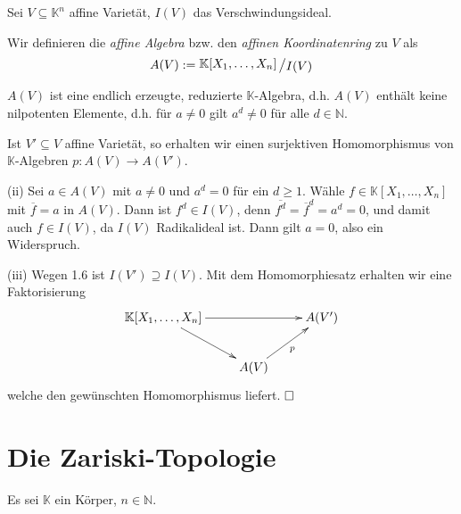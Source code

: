 \documentclass[11pt]{book}
\theoremstyle{nonumberbreak}
\newenvironment{pr}[1][]{\ifthenelse{\equal{#1}{}}{\proof}{\proof[#1]}\rm}{\endproof}
\newenvironment{definbem}[1][]{\ifthenelse{\equal{#1}{}}{\definibem}{\definibem[#1]}\rm}{\enddefinibem}
\newcommand{\slant}[2]{{\raisebox{.1em}{$#1$}\left/\raisebox{-.1em}{$#2$}\right.}}
\begin{document}
\begin{spacing}{1.3}
\begin{definbem}
Sei $V \subseteq \mathbb{K}^n$ affine Varietät, $I(V)$ das Verschwindungsideal.
\begin{compactenum}
\item Wir definieren die \textit{affine Algebra} bzw. den \textit{affinen Koordinatenring} zu $V$ als
$$A(V):=\slant{\mathbb{K}[X_1, \ldots, X_n]}{I(V)}$$
\item $A(V)$ ist eine endlich erzeugte, reduzierte $\mathbb{K}$-Algebra, d.h. $A(V)$ enthält keine nilpotenten Elemente, d.h. für $a\neq 0$ gilt $a^d \neq 0$ für alle $d \in \mathbb{N}$.
\item Ist $V'\subseteq V$ affine Varietät, so erhalten wir einen surjektiven Homomorphismus von $\mathbb{K}$-Algebren $p: A(V) \longrightarrow A(V')$.
\end{compactenum}
\begin{pr}
\begin{compactenum}
\item[(ii)] Sei $a \in A(V)$ mit $a \neq 0$ und $a^d=0$ für ein $d\geqslant 1$. Wähle $f \in \mathbb{K}[X_1, \ldots, X_n]$ mit $\overline{f}=a$ in $A(V)$. Dann ist $f^d \in I(V)$, denn $\overline{f^d}=\overline{f}^d=a^d=0$, und damit auch $f \in I(V)$, da $I(V)$ Radikalideal ist. Dann gilt $a=0$, also ein Widerspruch.
\item[(iii)] Wegen 1.6 ist $I(V') \supseteq I(V)$. Mit dem Homomorphiesatz erhalten wir eine Faktorisierung\\
$$
\begin{xy}
\xymatrix{
\mathbb{K}[X_1, \ldots, X_n] \ar[rr] \ar[rd] && A(V') \\ & A(V) \ar[ru]_{p} & 
}
\end{xy}
$$
welche den gewünschten Homomorphismus liefert. $\hfill \Box$
\end{compactenum}
\end{pr}
\end{definbem}


\renewcommand*\thesection{§ \arabic{section}\quad}
\section{Die Zariski-Topologie} %
\renewcommand*\thesection{\arabic{section}}

Es sei $\mathbb{K}$ ein Körper, $n \in \mathbb{N}$.


\end{spacing}
\end{document}
